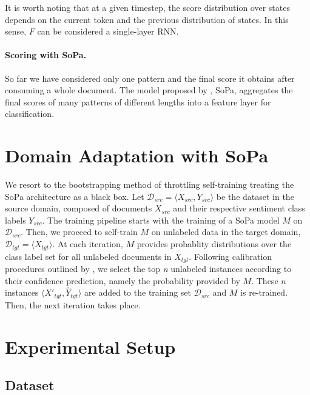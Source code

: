 \documentclass[11pt,a4paper]{article}
\begin{document}
It is worth noting that at a given timestep, the score distribution over states depends on the current token and the previous distribution of states. In this sense, $F$ can be considered a single-layer RNN.


\paragraph{Scoring with SoPa.}
So far we have considered only one pattern and the final score it obtains after consuming a whole document.
The model proposed by \cite{schwartz2018sopa}, {\sc SoPa}, aggregates the final scores of many patterns of different lengths into a feature layer for classification.



\section{Domain Adaptation with SoPa}

We resort to the bootstrapping method of throttling self-training treating the {\sc SoPa} architecture as a black box.
Let $\mathcal{D}_{src}=\langle X_{src},Y_{src} \rangle$ be the dataset in the source domain, composed of documents $X_{src}$ and their respective sentiment class labels $Y_{src}$.
The training pipeline starts with the training of a {\sc SoPa} model $M$ on $\mathcal{D}_{src}$.
Then, we proceed to self-train $M$ on unlabeled data in the target domain, $\mathcal{D}_{tgt}=\langle X_{tgt} \rangle$. At each iteration, $M$ provides probablity distributions over the class label set for all unlabeled documents in $X_{tgt}$. Following calibration procedures outlined by \cite{ruder2018strong}, we select the top {\it n} unlabeled instances according to their confidence prediction, namely the probability provided by $M$. These $n$ instances $\langle X'_{tgt},\hat{Y}_{tgt} \rangle$ are added to the training set $\mathcal{D}_{src}$ and $M$ is re-trained. Then, the next iteration takes place.


\section{Experimental Setup}



\subsection{Dataset}
\end{document}
